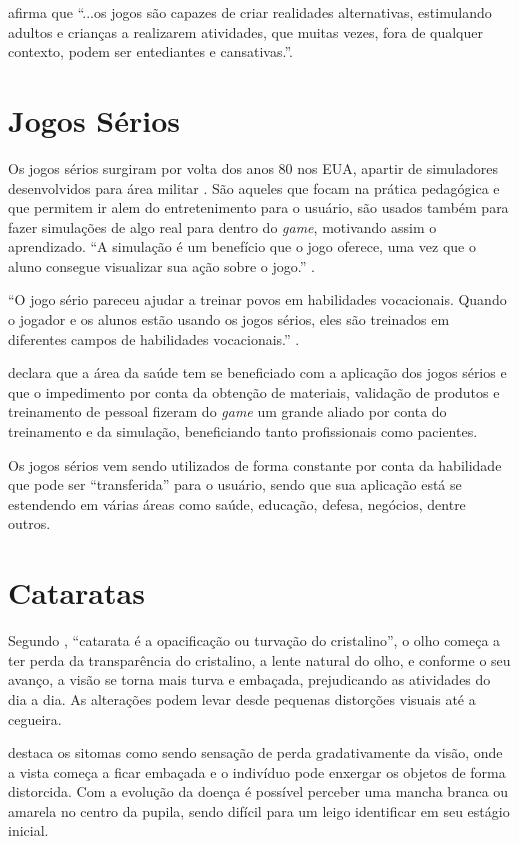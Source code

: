 \documentclass[
	12pt,				%
    oneside,			%
	a4paper,			%
	english,			%
	french,				%
	spanish,			%
	brazil,				%
	]{abntex2}
\begin{document}
 afirma que \enquote{...os jogos são capazes de criar realidades alternativas, estimulando adultos e crianças a realizarem atividades, que muitas vezes, fora de qualquer contexto, podem ser entediantes e cansativas.}.

\section{Jogos Sérios}

Os jogos sérios surgiram por volta dos anos 80 nos EUA, apartir de simuladores desenvolvidos para área militar \cite{machado}. São aqueles que focam na prática pedagógica e que permitem ir alem do entretenimento para o usuário, são usados também para fazer simulações de algo real para dentro do \textit{game}, motivando assim o aprendizado.
\enquote{A simulação é um benefício que o jogo oferece, uma vez que o aluno consegue visualizar sua ação sobre o jogo.} \cite{simulacao}.

\enquote{O jogo sério pareceu ajudar a treinar povos em habilidades vocacionais. Quando o jogador e os alunos estão usando os jogos sérios, eles são treinados em diferentes campos de habilidades vocacionais.} \cite{jogosserios}.

 declara que a área da saúde tem se beneficiado com a aplicação dos jogos sérios e que o impedimento por conta da obtenção de materiais, validação de produtos e treinamento de pessoal fizeram do \textit{game} um grande aliado por conta do treinamento e da simulação, beneficiando tanto profissionais como pacientes.

Os jogos sérios vem sendo utilizados de forma constante por conta da habilidade que pode ser \enquote{transferida} para o usuário, sendo que sua aplicação está se estendendo em várias áreas como saúde, educação, defesa, negócios, dentre outros. 

\section{Cataratas}
Segundo , \enquote{catarata é a opacificação ou turvação do cristalino}, o olho começa a ter perda da transparência do cristalino, a lente natural do olho, e conforme o seu avanço, a visão se torna mais turva e embaçada, prejudicando as atividades do dia a dia. As alterações podem levar desde pequenas distorções visuais até a cegueira.

 destaca os sitomas como sendo sensação de perda gradativamente da visão, onde a vista começa a ficar embaçada e o indivíduo pode enxergar os objetos de forma distorcida. Com a evolução da doença é possível perceber uma mancha branca ou amarela no centro da pupila, sendo difícil para um leigo identificar em seu estágio inicial.
\end{document}
